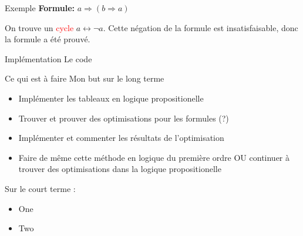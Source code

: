 \documentclass{beamer}
\begin{document}
\begin{frame}{Exemple}
    \textbf{Formule:} $a \Rightarrow (b \Rightarrow a)$

    \begin{center}

        On trouve un \textcolor{red}{cycle} $a\leftrightarrow \lnot a$. Cette négation de la formule est insatisfaisable,
        donc la formule a été prouvé.

    \end{center}
\end{frame}

\begin{frame}{Implémentation}
    Le code
\end{frame}

\begin{frame}{Ce qui est à faire}
    Mon but sur le long terme
    \begin{itemize}[<+->]
        \item Implémenter les tableaux en logique propositionelle
        \item Trouver et prouver des optimisations pour les formules (?)
        \item Implémenter et commenter les résultats de l'optimisation
        \item Faire de même cette méthode en logique du première ordre OU continuer à trouver des optimisations dans la logique propositionelle
    \end{itemize}
    Sur le court terme :
    \begin{itemize}[<+->]
        \item One
        \item Two
    \end{itemize}
\end{frame}
\end{document}
